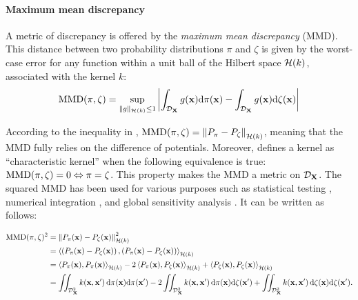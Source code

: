 \paragraph{Maximum mean discrepancy}
A metric of discrepancy is offered by the \emph{maximum mean discrepancy} (MMD). 
This distance between two probability distributions $\pi$ and $\zeta$ is given by the worst-case error for any function within a unit ball of the Hilbert space $\mathcal{H}(k)$, associated with the kernel $k$:
\begin{equation}
    \MMD(\pi, \zeta) = %
    \sup_{\lVert g \lVert_{\iH(k)} \leq 1}
            \left | \int_{\iD_{\bX}} g(\bx) \dd \pi(\bx) - \int_{\iD_{\bX}} g(\bx) \dd \zeta(\bx) \right| %
    \label{eq:mmd_c4}  
\end{equation}

According to the inequality in , $\mathrm{MMD}(\pi, \zeta) = \left\lVert P_{\pi} - P_{\zeta} \right\lVert_{\mathcal{H}(k)}$, meaning that the MMD fully relies on the difference of potentials. 
Moreover, \cite{sriperumbudur_2010} defines a kernel as ``characteristic kernel'' when the following equivalence is true: $\mathrm{MMD}(\pi, \zeta) = 0 \Leftrightarrow \pi = \zeta$. 
This property makes the MMD a metric on $\mathcal{D}_{{\bf X}}$. 
The squared MMD has been used for various purposes such as statistical testing \citep{gretton_2006}, numerical integration \citep{chen_welling_2010}, and global sensitivity analysis \citep{daveiga_2015}. 
It can be written as follows:

\begin{subequations}
\begin{align}
    \mathrm{MMD}(\pi, \zeta)^2 &= \left\lVert P_{\pi}({\bf x}) - P_{\zeta}({\bf x}) \right\lVert^2_{\mathcal{H}(k)}\\
        &= \left\langle \left(P_{\pi}({\bf x}) - P_{\zeta}({\bf x}) \right), \left(P_{\pi}({\bf x}) - P_{\zeta}({\bf x}) \right) \right\rangle_{\mathcal{H}(k)}\\
        &= \left\langle P_{\pi}({\bf x}), P_{\pi}({\bf x}) \right\rangle_{\mathcal{H}(k)} - 2 \left\langle P_{\pi}({\bf x}), P_{\zeta}({\bf x}) \right\rangle_{\mathcal{H}(k)} + \left\langle P_{\zeta}({\bf x}), P_{\zeta}({\bf x}) \right\rangle_{\mathcal{H}(k)}\\
        &= \iint_{\mathcal{D}_{{\bf X}}^2} k({\bf x}, {\bf x}')\, \mathrm{d}\pi({\bf x}) \mathrm{d}\pi({\bf x}') - 2 \iint_{\mathcal{D}_{{\bf X}}^2} k({\bf x}, {\bf x}')\, \mathrm{d}\pi({\bf x}) \mathrm{d}\zeta({\bf x}') + \iint_{\mathcal{D}_{{\bf X}}^2} k({\bf x}, {\bf x}')\, \mathrm{d}\zeta({\bf x}) \mathrm{d}\zeta({\bf x}').
\end{align}
\end{subequations}

